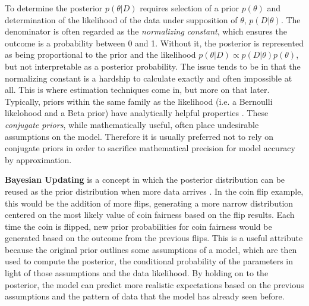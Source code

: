 To determine the posterior $p(\theta|D)$ requires selection of a prior $p(\theta)$ and determination of the likelihood of the data under supposition of $\theta$, $p(D|\theta)$.  The denominator is often regarded as the \textit{normalizing constant}, which ensures the outcome is a probability between 0 and 1.  Without it, the posterior is represented as being proportional to the prior and the likelihood $p(\theta|D) \propto p(D|\theta)p(\theta)$, but not interpretable as a posterior probability.  The issue tends to be in that the normalizing constant is a hardship to calculate exactly and often impossible at all.  This is where estimation techniques come in, but more on that later.
Typically, priors within the same family as the likelihood (i.e. a Bernoulli likelohood and a Beta prior) have analytically helpful properties \cite{mullachery2018bayesian}. These \textit{conjugate priors}, while mathematically useful, often place undesirable assumptions on the model.  Therefore it is usually preferred not to rely on conjugate priors in order to sacrifice mathematical precision for model accuracy by approximation.

\textbf{Bayesian Updating} is a concept in which the posterior distribution can be reused as the prior distribution when more data arrives \cite{mcelreath2016statistical}.  In the coin flip example, this would be the addition of more flips, generating a more narrow distribution centered on the most likely value of coin fairness based on the flip results.  Each time the coin is flipped, new prior probabilities for coin fairness would be generated based on the outcome from the previous flips.  This is a useful attribute because the original prior outlines some assumptions of a model, which are then used to compute the posterior, the conditional probability of the parameters in light of those assumptions and the data likelihood.  By holding on to the posterior, the model can predict more realistic expectations based on the previous assumptions and the pattern of data that the model has already seen before.





